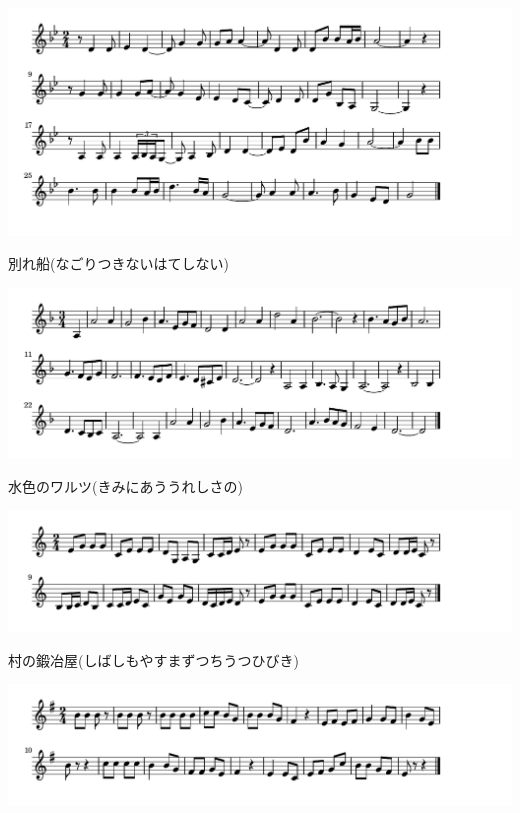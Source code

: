 \documentclass[a4paper]{ltjsarticle}
\begin{document}
\includegraphics[clip]{wakarebune_crop.pdf}

\vspace{-10mm} \hspace{10mm}
別れ船(なごりつきないはてしない)

\includegraphics[clip]{mizuironowaltz_crop.pdf}

\vspace{-10mm} \hspace{10mm}
水色のワルツ(きみにあううれしさの)

\includegraphics[clip]{muranokajiya_crop.pdf}

\vspace{-10mm} \hspace{10mm}
村の鍛冶屋(しばしもやすまずつちうつひびき)

\includegraphics[clip]{naishobanashi_crop.pdf}
\end{document}

